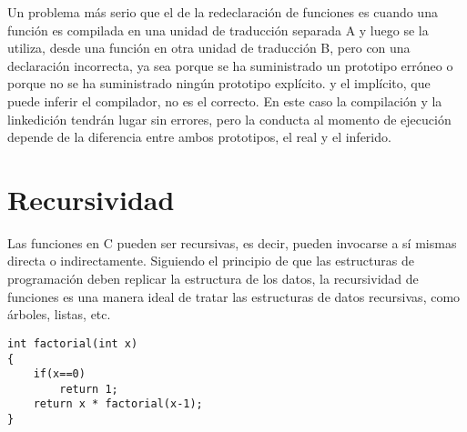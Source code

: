 Un problema más serio que el de la redeclaración de funciones es cuando una
función es compilada en una unidad de traducción separada A y luego se la
utiliza, desde una función en otra unidad de traducción B, pero con una
declaración incorrecta, ya sea porque se ha suministrado un prototipo erróneo o
porque no se ha suministrado ningún prototipo explícito. y el implícito, que
puede inferir el compilador, no es el correcto. En este caso la compilación y
la linkedición tendrán lugar sin errores, pero la conducta al momento de
ejecución depende de la diferencia entre ambos prototipos, el real y el
inferido.

\section{Recursividad}
Las funciones en C pueden ser recursivas, es decir, pueden invocarse a sí
mismas directa o indirectamente. Siguiendo el principio de que las estructuras
de programación deben replicar la estructura de los datos, la recursividad de
funciones es una manera ideal de tratar las estructuras de datos recursivas,
como árboles, listas, etc.
\begin{lstlisting}
int factorial(int x)
{
    if(x==0)
        return 1;
    return x * factorial(x-1);
}
\end{lstlisting}


